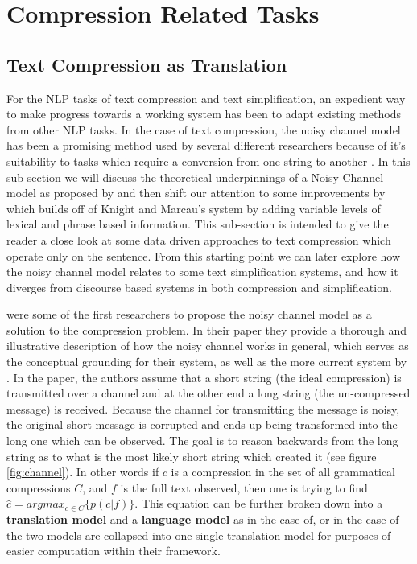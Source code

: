 \section{Compression Related Tasks}


\subsection{Text Compression as Translation}


{For the NLP tasks of text compression and text simplification, an expedient way to make progress towards a working system has been to adapt existing methods from other NLP tasks.  In the case of text compression, the noisy channel model has been a promising method used by several different researchers because of it's suitability to tasks which require a conversion from one string to another \citep{knight2000statistics,galley2007lexicalized}. In this sub-section we will discuss the theoretical underpinnings of a Noisy Channel model as proposed by \citet{knight2000statistics} and then shift our attention to some improvements by \citet{galley2007lexicalized} which builds off of Knight and Marcau's system by adding variable levels of lexical and phrase based information. This sub-section is intended to give the reader a close look at some data driven approaches to text compression which operate only on the sentence. From this starting point we can later explore how the noisy channel model relates to some text simplification systems, and how it diverges from discourse based systems in both compression and simplification.}

{\citet{knight2000statistics} were some of the first researchers to propose the noisy channel model as a solution to the compression problem.  In their paper they provide a thorough and illustrative description of how the noisy channel works in general, which serves as the conceptual grounding for their system, as well as the more current system by \citet{galley2007lexicalized}.  In the paper, the authors assume that a short string (the ideal compression) is transmitted over a channel and at the other end a long string (the un-compressed message) is received.  Because the channel for transmitting the message is noisy, the original short message is corrupted and ends up being transformed into the long one which can be observed. The goal is to reason backwards from the long string as to what is the most likely short string which created it (see figure \ref{fig:channel}).  In other words if $ c $ is a compression in the set of all grammatical compressions $C$, and $ f $ is the full text observed, then one is trying to find $ \hat{c} = argmax_{c\in C} \{ p(c|f)\} $.  This equation can be further broken down into a \textbf{translation model} and a \textbf{language model} as in the case of\citet{knight2000statistics}, or in the case of \citet{galley2007lexicalized} the two models are collapsed into one single translation model for purposes of easier computation within their framework.}


